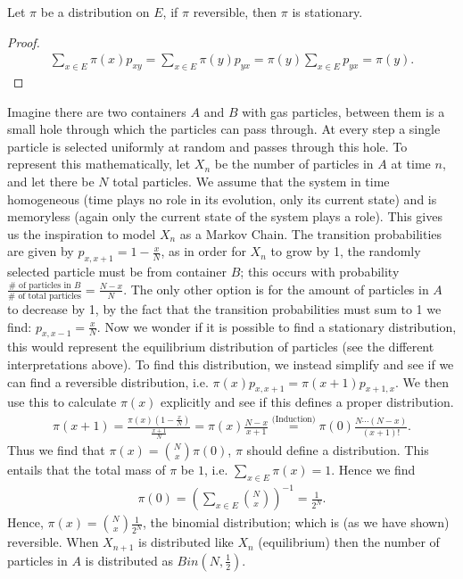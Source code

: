 \begin{prop}[]
	Let $\pi $ be a distribution on $E$, if $\pi $ reversible, then $\pi $ is stationary.
\end{prop}
\begin{proof}
	\begin{align}
		\sum_{x \in E}^{} \pi (x)p_{xy} = \sum_{x \in E}^{} \pi (y) p_{yx} = \pi (y) \sum_{x \in E}^{} p_{yx} = \pi(y) 
	.\end{align}	
\end{proof}

\begin{ex}
	Imagine there are two containers $A$ and $B$ with gas particles, between them is a small hole through which the particles can pass through. At every step a single particle is selected uniformly at random and passes through this hole. To represent this mathematically, let $X_n$ be the number of particles in $A$ at time $n$, and let there be $N$ total particles. We assume that the system in time homogeneous (time plays no role in its evolution, only its current state) and is memoryless (again only the current state of the system plays a role). This gives us the inspiration to model $X_n$ as a Markov Chain. The transition probabilities are given by $p_{x, x+1}= 1- \frac{x}{N}$, as in order for $X_n$ to grow by 1, the randomly selected particle must be from container $B $; this occurs with probability $\frac{\# \textrm{ of particles in }B}{\# \textrm{ of total particles}} = \frac{N-x}{N}$. The only other option is for the amount of particles in $A$ to decrease by 1, by the fact that the transition probabilities must sum to 1 we find: $p_{x, x-1}= \frac{x}{N}$. Now we wonder if it is possible to find a stationary distribution, this would represent the equilibrium distribution of particles (see the different interpretations above). To find this distribution, we instead simplify and see if we can find a reversible distribution, i.e. $\pi (x) p_{x,x+1} = \pi (x+1)p_{x+1, x}$. We then use this to calculate $\pi (x)$ explicitly and see if this defines a proper distribution. 
	\begin{align}
		\pi (x+1) = \frac{\pi (x)(1 - \frac{x}{N})}{\frac{x+1}{N}} = \pi (x) \frac{N-x}{x+1} \stackrel{\textrm{(Induction)}}{=} \pi (0) \frac{N  \cdots (N-x)}{(x+1)!} 
	.\end{align}	
	Thus we find that $\pi (x) = \binom{N}{x}\pi(0)$, $\pi$ should define a distribution. This entails that the total mass of $\pi $ be $1$, i.e. $\sum_{x \in E}^{} \pi (x)=1$. Hence we find 
\begin{align}
\pi (0) = \left( \sum_{x \in E}^{} \binom{N}{x} \right)^{-1} = \frac{1}{2^N} 
.\end{align}
Hence, $\pi (x)= \binom{N}{x} \frac{1}{2^N}$, the binomial distribution; which is (as we have shown) reversible. When $X_{n+1}$ is distributed like $X_n$ (equilibrium) then the number of particles in $A$ is distributed as $Bin(N, \frac{1}{2})$.
\end{ex}


